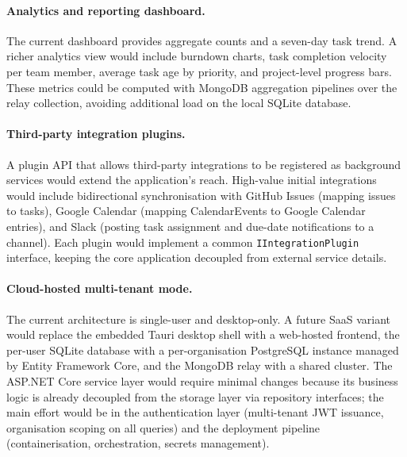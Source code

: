 \paragraph{Analytics and reporting dashboard.}
The current dashboard provides aggregate counts and a seven-day task trend.
A richer analytics view would include burndown charts, task completion velocity per
team member, average task age by priority, and project-level progress bars.
These metrics could be computed with MongoDB aggregation pipelines over the relay
collection, avoiding additional load on the local SQLite database.

\paragraph{Third-party integration plugins.}
A plugin API that allows third-party integrations to be registered as background
services would extend the application's reach.
High-value initial integrations would include bidirectional synchronisation with
GitHub Issues (mapping issues to tasks), Google Calendar (mapping CalendarEvents to
Google Calendar entries), and Slack (posting task assignment and due-date notifications
to a channel).
Each plugin would implement a common \texttt{IIntegrationPlugin} interface, keeping
the core application decoupled from external service details.

\paragraph{Cloud-hosted multi-tenant mode.}
The current architecture is single-user and desktop-only.
A future SaaS variant would replace the embedded Tauri desktop shell with a web-hosted
frontend, the per-user SQLite database with a per-organisation PostgreSQL instance
managed by Entity Framework Core, and the MongoDB relay with a shared cluster.
The ASP.NET Core service layer would require minimal changes because its business logic
is already decoupled from the storage layer via repository interfaces;
the main effort would be in the authentication layer (multi-tenant JWT issuance,
organisation scoping on all queries) and the deployment pipeline (containerisation,
orchestration, secrets management).
